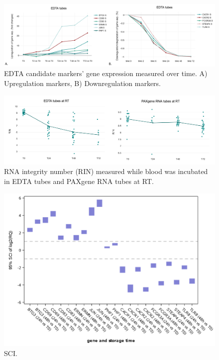 \documentclass[fleqn,10pt]{wlscirep}
\begin{document}
\begin{figure}[ht]
    \centering
    \includegraphics[width=\linewidth]{figure2}
    \caption{EDTA candidate markers' gene expression measured over time. A) Upregulation markers, B) Downregulation markers.}
    \label{fig:figure2}
    \end{figure}

\begin{figure}[ht]
    \centering
    \includegraphics[width=\linewidth]{figure3}
    \caption{RNA integrity number (RIN) measured while blood was incubated in EDTA tubes and PAXgene RNA tubes at RT.}
    \label{fig:figure3}
    \end{figure}

\begin{figure}[ht]
    \centering
    \includegraphics[width=\linewidth]{figure4}
    \caption{SCI.}
    \label{fig:figure4}
    \end{figure}
\end{document}
